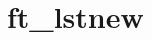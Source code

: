 \chapter{ft\+\_\+lstnew}
\hypertarget{md_Documentation_2ft__lstnew}{}\label{md_Documentation_2ft__lstnew}
